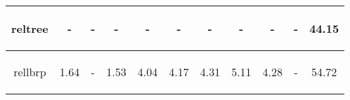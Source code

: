 \documentclass{article}
\begin{document}
\begin{table}[H]
\begin{center}
\begin{tabular}{|c|c|c|c|c|c|c|c|c|c|c|}
				    reltree & \begin{footnotesize}-\end{footnotesize} & \begin{footnotesize}-\end{footnotesize} & \begin{footnotesize}-\end{footnotesize} & \begin{footnotesize}-\end{footnotesize} & \begin{footnotesize}-\end{footnotesize} & \begin{footnotesize}-\end{footnotesize} & \begin{footnotesize}-\end{footnotesize} & \begin{footnotesize}-\end{footnotesize} & \begin{footnotesize}-\end{footnotesize} & \begin{footnotesize}44.15\end{footnotesize} \\ \hline
   				    rellbrp & \begin{footnotesize}1.64\end{footnotesize} & \begin{footnotesize}-\end{footnotesize} & \begin{footnotesize}1.53\end{footnotesize} & \begin{footnotesize}4.04\end{footnotesize} & \begin{footnotesize}4.17\end{footnotesize} & \begin{footnotesize}4.31\end{footnotesize} & \begin{footnotesize}5.11\end{footnotesize} & \begin{footnotesize}4.28\end{footnotesize} & \begin{footnotesize}-\end{footnotesize} & \begin{footnotesize}54.72\end{footnotesize} \\ \hline

\end{tabular}
\end{center}
\end{table}
\end{document}
